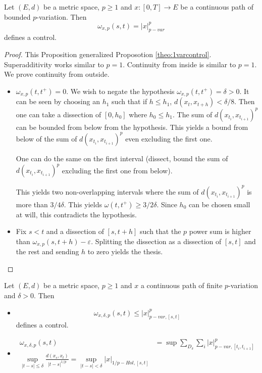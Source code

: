 \begin{proposition}
    Let $(E,d)$ be a metric space, $p \geq 1$ and $x: [0,T] \rightarrow E$ be a continuous path of bounded $p$-variation. Then
    \begin{equation}
        \omega_{x,p}(s,t) = |x|_{p-var}^p
    \end{equation}
    defines a control.
\end{proposition}
\begin{proof}
    This Proposition generalized Proposotion \ref{theo:1varcontrol}.
    Superadditivity works similar to $p=1$.
    Continuity from inside is similar to $p=1$.
    We prove continuity from outside.
    \begin{itemize}
        \item $\omega_{x,p}(t,t^+) = 0$.
        We wish to negate the hypothesis $\omega_{x,p}(t,t^+) = \delta > 0$.
        It can be seen by choosing an $h_1$ such that if $h \leq h_1$, $d(x_t,x_{t+h}) < \delta / 8.$
        Then one can take a dissection of $[0,h_0]$ where $h_0 \leq h_1$.
        The sum of $d(x_{t_i},x_{t_{i+1}})^p$ can be bounded from below from the hypothesis.
        This yields a bound from below of the sum of $d(x_{t_i},x_{t_{i+1}})^p$ even excluding the first one.
        
        One can do the same on the first interval (dissect, bound the sum of $d(x_{t_i},x_{t_{i+1}})^p$ excluding the first one from below).

        This yields two non-overlapping intervals where the sum of $d(x_{t_i},x_{t_{i+1}})^p$ is more than $3/4 \delta.$ This yields $\omega(t, t^+) \geq 3/2 \delta.$ Since $h_0$ can be chosen small at will, this contradicts the hypothesis.
        \item Fix $s < t$ and a dissection of $[s,t+h]$ such that the $p$ power sum is higher than $\omega_{x,p}(s,t+h) - \varepsilon.$ Splitting the dissection as a dissection of $[s,t]$ and the rest and sending $h$ to zero yields the thesis.
    \end{itemize}
\end{proof}

\begin{proposition}
    Let $(E,d)$ be a metric space, $p \geq 1$ and $x$ a continuous path of finite $p$-variation and $\delta > 0.$ Then
    \begin{itemize}
        \item \begin{equation}
            \omega_{x,\delta,p}(s,t) \leq |x|_{p-var,[s,t]}^p
        \end{equation}
        defines a control.
        \item \begin{align}
            \omega_{x,\delta,p}(s,t) &= \sup \sum_{D_\delta} \sum_i |x|_{p-var,[t_i,t_{i+1}]}^p \\
            \sup_{|t - s| \leq \delta} \frac{d(x_s, x_t)}{|t - s|^{1/p}} = \sup_{|t - s| < \delta} |x|_{1/p-Hol, [s,t]}
        \end{align}
    \end{itemize}
\end{proposition}

